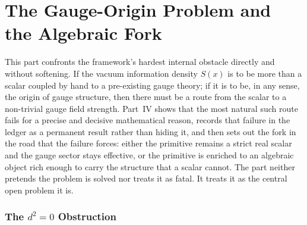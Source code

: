 \documentclass[12pt,a4paper,twoside]{article}
\theoremstyle{plain}
\theoremstyle{definition}
\theoremstyle{remark}
\begin{document}

\part{The Gauge-Origin Problem and the Algebraic Fork}
\label{part:gauge-origin}

\noindent This part confronts the framework's hardest internal obstacle directly and without softening. If the vacuum information density $S(x)$ is to be more than a scalar coupled by hand to a pre-existing gauge theory; if it is to be, in any sense, the origin of gauge structure, then there must be a route from the scalar to a non-trivial gauge field strength. Part~IV shows that the most natural such route fails for a precise and decisive mathematical reason, records that failure in the ledger as a permanent result rather than hiding it, and then sets out the fork in the road that the failure forces: either the primitive remains a strict real scalar and the gauge sector stays effective, or the primitive is enriched to an algebraic object rich enough to carry the structure that a scalar cannot. The part neither pretends the problem is solved nor treats it as fatal. It treats it as the central open problem it is.

\section{The \texorpdfstring{$d^2 = 0$}{d2=0} Obstruction}
\label{sec:d2-obstruction}
\end{document}
